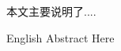 \begin{cnabstract}
    本文主要说明了....

\end{cnabstract}

\begin{enabstract}
English Abstract Here

\end{enabstract}

